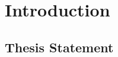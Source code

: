 \documentclass[thesis-solanki.tex]{subfiles}
\begin{document}
\chapter{Introduction}\label{chap:introduction}
\begin{comment}
\section{Beginnings}
Computers have become a part of everyone's life. From the ones in our pockets to the ones on desks or in our school bags, working or in fact living without 
them is difficult if not impossible. All the more reason to know how to use one. Simply speaking just using a computer these days is not enough. To be able 
to utilise their true potential, one must go deeper and communicate with them. This is where the art of programming steps in.     

\par Programming has become an integral part of working and interacting with computers and day by day more and more complex problems are being 
tackled using the power of programming technologies. It is possibly the only way to talk to computers and hence the need for a robust and multi purpose 
programming language has never been more urgent. The desirability of a programming language depends on a lot of factors such as the ease of use, the 
features and functionalities that it provides, adaptability and what sort of problems can it solve. One is  spoilt for choice with a number of options for a 
wide variety of programming paradigms, for example Object Oriented Languages. Over the last decade the declarative style of programming has gained 
popularity. The methodologies that have stood out are the Functional and Logical Approaches. The former is based on Functions and Lambda Calculus, 
while the latter is based on Horn Clause Logic. Each of them has its own advantages and ﬂaws. How does one choose which approach to adopt? Perhaps
one does not need to choose! This document looks at the attempts, improvements and future possibilities of uniting \progLang{Haskell}, a Purely 
Functional Programming Language and \progLang{Prolog}, a Logical Programming Language so that one is not forced to choose.

\end{comment}

\section{Thesis Statement}
\end{document}

